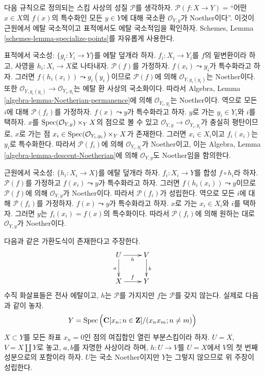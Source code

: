 \begin{example}
\label{example-silly-two}
다음 규칙으로 정의되는 스킴 사상의 성질 $\mathcal{P}$를 생각하자.
$\mathcal{P}(f : X \to Y) = $``어떤 $x \in X$의 $f(x)$의 특수화인
모든 $y \in Y$에 대해 국소환 $\mathcal{O}_{Y, y}$가 Noether이다''.
이것이 근원에서 에탈 국소적이고 표적에서도 에탈 국소적임을 확인하자.
Schemes, Lemma \ref{schemes-lemma-specialize-points}를 자유롭게 사용한다.

\medskip\noindent
표적에서 국소성:
$\{g_i : Y_i \to Y\}$를 에탈 덮개라 하자. $f_i : X_i \to Y_i$를
$f$의 밑변환이라 하고, 사영을 $h_i : X_i \to X$로 나타내자.
$\mathcal{P}(f)$를 가정하자. $f(x_i) \leadsto y_i$가 특수화라고 하자.
그러면 $f(h_i(x_i)) \leadsto g_i(y_i)$이므로 $\mathcal{P}(f)$에 의해
$\mathcal{O}_{Y, g_i(y_i)}$는 Noether이다. 또한
$\mathcal{O}_{Y, g_i(y_i)} \to \mathcal{O}_{Y_i, y_i}$는 에탈 환
사상의 국소화이다. 따라서 Algebra, Lemma
\ref{algebra-lemma-Noetherian-permanence}에 의해
$\mathcal{O}_{Y_i, y_i}$는 Noether이다. 역으로 모든 $i$에 대해
$\mathcal{P}(f_i)$를 가정하자. $f(x) \leadsto y$가 특수화라고 하자.
$y$로 가는 $y_i \in Y_i$와 $i$를 택하자. $x$를
$\mathop{\mathrm{Spec}}(\mathcal{O}_{Y, y}) \times_Y X$의 점으로 볼 수 있고
$\mathcal{O}_{Y, y} \to \mathcal{O}_{Y_i, y_i}$가 충실히 평탄이므로,
$x$로 가는 점
$x_i \in \mathop{\mathrm{Spec}}(\mathcal{O}_{Y_i, y_i}) \times_Y X$가 존재한다.
그러면 $x_i \in X_i$이고 $f_i(x_i)$는 $y_i$로 특수화한다.
따라서 $\mathcal{P}(f_i)$에 의해 $\mathcal{O}_{Y_i, y_i}$가
Noether이고, 이는 Algebra, Lemma
\ref{algebra-lemma-descent-Noetherian}에 의해 $\mathcal{O}_{Y, y}$도
Noether임을 함의한다.

\medskip\noindent
근원에서 국소성:
$\{h_i : X_i \to X\}$를 에탈 덮개라 하자. $f_i : X_i \to Y$를
합성 $f \circ h_i$라 하자. $\mathcal{P}(f)$를 가정하고
$f(x_i) \leadsto y$가 특수화라고 하자. 그러면
$f(h_i(x_i)) \leadsto y$이므로 $\mathcal{P}(f)$에 의해
$\mathcal{O}_{Y, y}$가 Noether이다. 따라서 $\mathcal{P}(f_i)$가
성립한다. 역으로 모든 $i$에 대해 $\mathcal{P}(f_i)$를 가정하자.
$f(x) \leadsto y$가 특수화라고 하자. $x$로 가는 $x_i \in X_i$와
$i$를 택하자. 그러면 $y$는 $f_i(x_i) = f(x)$의 특수화이다. 따라서
$\mathcal{P}(f_i)$에 의해 원하는 대로 $\mathcal{O}_{Y, y}$가
Noether이다.

\medskip\noindent
다음과 같은 가환도식이 존재한다고 주장한다.
$$
\xymatrix{
U \ar[d]_a \ar[r]_h & V \ar[d]^b \\
X \ar[r]^f & Y
}
$$
수직 화살표들은 전사 에탈이고, $h$는 $\mathcal{P}$를 가지지만
$f$는 $\mathcal{P}$를 갖지 않는다. 실제로 다음과 같이 놓자.
$$
Y =
\mathop{\mathrm{Spec}}\Big(
\mathbf{C}[x_n; n \in \mathbf{Z}]/(x_n x_m; n \not = m)
\Big)
$$
$X \subset Y$를 모든 좌표 $x_n = 0$인 점의 여집합인 열린 부분스킴이라
하자. $U = X$, $V = X \amalg Y$로 놓고, $a, b$를 자명한 사상이라
하며, $h : U \to V$를 $U = X$에서 $V$의 첫 번째 성분으로의 포함이라
하자. $U$는 국소 Noether이지만 $Y$는 그렇지 않으므로 위 주장이
성립한다.
\end{example}

